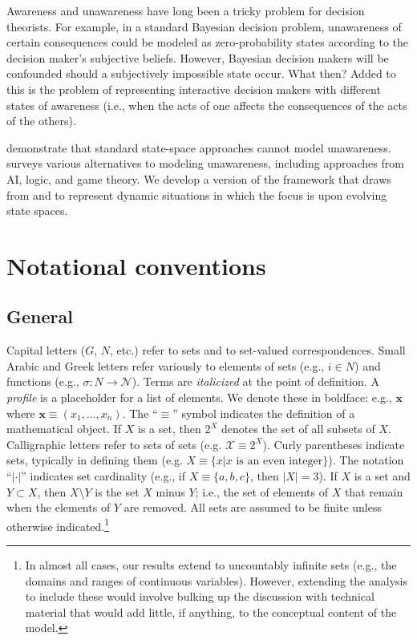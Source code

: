 \documentclass[
11pt,
titlepage,
reqno,
]{article}%
\theoremstyle{definition}
\begin{document}
Awareness and unawareness have long been a tricky problem for decision theorists. 
For example, in a standard Bayesian decision problem, unawareness of certain consequences could be modeled as zero-probability states according to the decision maker's subjective beliefs. 
However, Bayesian decision makers will be confounded should a subjectively impossible state occur. 
What then?
Added to this is the problem of representing interactive decision makers with different states of awareness (i.e., when the acts of one affects the consequences of the acts of the others). 

\citet{Dekel1998} demonstrate that standard state-space approaches cannot model unawareness. 
\citet{Schipper2015} surveys various alternatives to modeling unawareness, including approaches from  AI, logic, and game theory. 
We develop a version of the framework that draws from \citet{Heifetz2006} and \citet{Heifetz2013} \citep[also see][for related extensions]{Heifetz2008} to represent dynamic situations in which the focus is upon evolving state spaces.

	
\section{Notational conventions}
\subsection{General}
Capital letters ($G$, $N$, etc.) refer to sets and to set-valued correspondences.  
Small Arabic and Greek letters refer variously to elements of sets (e.g., $i\in N$) and functions (e.g., $\sigma:N\rightarrow \mathcal{N}$). 
Terms  are \textit{italicized} at the point of definition.  
A \textit{profile} is a placeholder for a list of elements.
We denote these in boldface: e.g., $\mathbf{x}$ where $\mathbf{x}\equiv(x_1,\ldots,x_n)$. 
The ``$\equiv$'' symbol indicates the definition of a mathematical object. 
If $X$ is a set, then $2^X$ denotes the set of all subsets of $X$. Calligraphic letters refer to sets of sets (e.g. $\mathcal{X}\equiv 2^X$). 
Curly parentheses indicate sets, typically in defining them (e.g. $X\equiv\{x|x\text{ is an even integer}\}$). 
The notation ``$|\cdot|$'' indicates set cardinality (e.g., if $X\equiv\{a,b,c\}$, then $|X|=3$). 
If $X$ is a set and $Y\subset X$, then $X\setminus Y$ is the set $X$ minus $Y$; i.e., the set of elements of $X$ that  remain when the elements of $Y$ are removed. 
All sets are assumed to be finite unless otherwise indicated.\footnote
{
	In almost all cases, our results extend to uncountably infinite sets (e.g., the domains and ranges of continuous variables). However, extending the analysis to include these would involve bulking up the discussion with technical material that would add little, if anything, to the conceptual content of the model.
}
\end{document}
